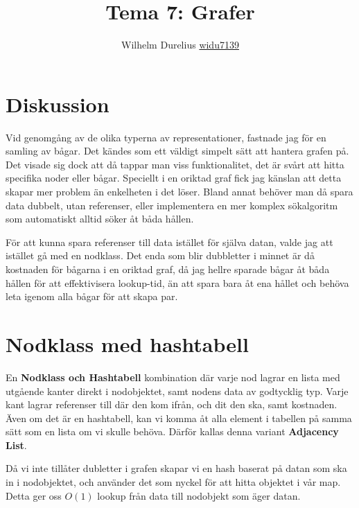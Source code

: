 \documentclass[a5paper,10pt,oneside]{article}
\title{Tema 7: Grafer}
\author{Wilhelm Durelius \url{widu7139}}
\begin{document}
\maketitle


\section{Diskussion}
Vid genomgång av de olika typerna av representationer, fastnade jag för en samling av bågar.
Det kändes som ett väldigt simpelt sätt att hantera grafen på.
Det visade sig dock att då tappar man viss funktionalitet, det är svårt att hitta specifika noder eller bågar. Speciellt i en oriktad graf fick jag känslan att detta skapar mer problem 
än enkelheten i det löser. Bland annat behöver man då spara data dubbelt, utan referenser, eller implementera en mer komplex sökalgoritm som automatiskt alltid söker åt båda hållen.

För att kunna spara referenser till data istället för själva datan, valde jag att istället gå med en nodklass. Det enda som blir dubbletter i minnet är då kostnaden för bågarna i en 
oriktad graf, då jag hellre sparade bågar åt båda hållen för att effektivisera lookup-tid, än att spara bara åt ena hållet och behöva leta igenom alla bågar för att skapa par.

\section{Nodklass med hashtabell}

En \textbf{Nodklass och Hashtabell} kombination där varje nod lagrar en lista med utgående kanter direkt i nodobjektet, samt nodens data av godtycklig typ.
Varje kant lagrar referenser till där den kom ifrån, och dit den ska, samt kostnaden. Även om det är en hashtabell, kan vi komma åt alla element i tabellen på samma sätt som en
lista om vi skulle behöva. Därför kallas denna variant \textbf{Adjacency List}.

Då vi inte tillåter dubletter i grafen skapar vi en hash baserat på datan som ska in i nodobjektet, och använder det som nyckel för att hitta objektet i vår map.
Detta ger oss $O(1)$ lookup från data till nodobjekt som äger datan.
\end{document}
